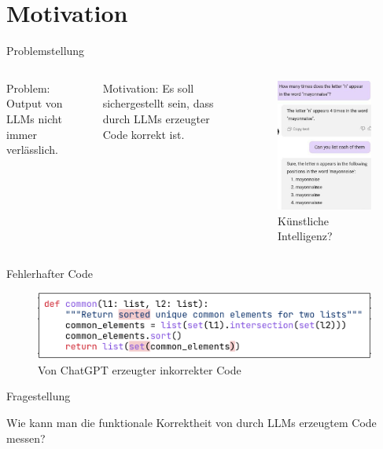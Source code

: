 \documentclass{beamer}              %
\begin{document}
\section{Motivation}
\begin{frame}{Problemstellung}
	\begin{columns}
Problem: Output von LLMs nicht immer verlässlich.

\vspace{30mm}

Motivation: Es soll sichergestellt sein, dass durch LLMs erzeugter Code korrekt ist.
        \begin{figure}
        \centering
        \includegraphics[width=0.35\paperwidth]{images/mayonnaise.png}
        \caption{Künstliche Intelligenz?\cite{mayonnaise:reddit}}
        \label{fig:stry}
    \end{figure}
    \end{columns}
\end{frame}

\begin{frame}{Fehlerhafter Code}
    \begin{figure}
        \centering
        \includegraphics[width=0.8\paperwidth]{images/sortedlistwrongnoHE.png}
        \caption{Von ChatGPT erzeugter inkorrekter Code\cite{liu2024your}}
    \end{figure}
\end{frame}
\begin{frame}{Fragestellung}

\centering Wie kann man die funktionale Korrektheit von durch LLMs erzeugtem Code messen?

\end{frame}
\end{document}
